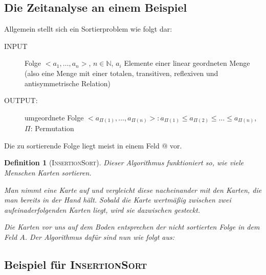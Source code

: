 \documentclass[ngerman,draft,parskip=half*,twoside]{scrreprt}
\theoremstyle{break}
\newtheorem{definition}{Definition}[chapter]
\theoremstyle{nonumberbreak}
\newcommand*{\N}{\mathbb{N}}        %
\begin{document}
\subsection{Die Zeitanalyse an einem Beispiel}

Allgemein stellt sich ein Sortierproblem wie folgt dar:
\begin{description}
 \item[INPUT] Folge $<a_1, \ldots, a_n>$, $n \in \N$, $a_i$
  Elemente einer linear geordneten Menge (also eine Menge mit einer totalen, transitiven,
  reflexiven und antisymmetrische Relation)
 \item[OUTPUT:] umgeordnete Folge $<a_{\Pi(1)}, \ldots, a_{\Pi(n)}>:
  a_{\Pi(1)} \le a_{\Pi(2)} \le {\ldots} \le a_{\Pi(n)}$, $\Pi$:
  Permutation
\end{description} 
Die zu sortierende Folge liegt meist in einem Feld @ vor.

\begin{definition}[\textsc{InsertionSort}]
  Dieser Algorithmus funktioniert so, wie viele Menschen Karten
  sortieren.
  
  Man nimmt eine Karte auf und vergleicht diese nacheinander
  mit den Karten, die man bereits in der Hand hält. Sobald die Karte
  wertmäßig zwischen zwei aufeinaderfolgenden Karten liegt, wird sie
  dazwischen gesteckt.
  
  Die Karten vor uns auf dem Boden entsprechen der nicht sortierten Folge
  in dem Feld $A$. Der Algorithmus dafür sind nun wie folgt aus:

  \begin{algorithm}
\caption{\textsc{InsertionSort}}
  \end{algorithm}
\end{definition}

\subsection{Beispiel für \textsc{InsertionSort}}
\end{document}
